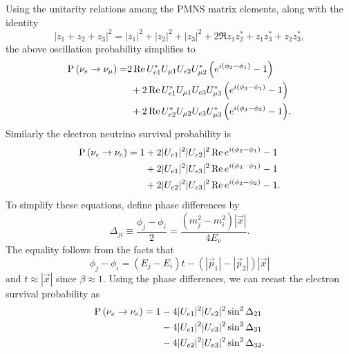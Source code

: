 Using the unitarity relations among the PMNS matrix elements, along with the
identity
\begin{equation}
  |z_1+z_2+z_3|^2=|z_1|^2+|z_2|^2+|z_3|^2
                  +2\Re{z_1z_2^*+z_1z_3^*+z_2z_3^*},
\end{equation}
the above oscillation probability simplifies to
\begin{equation}
  \begin{aligned}
    \operatorname{P}\left(\nu_e\to\nu_\mu\right)=&
    2\mathop{\mathrm{Re}}{U_{e1}^*U_{\mu 1}U_{e2}U_{\mu 2}^*\left(e^{i(\phi_2-\phi_1)}-1\right)}
     \\&~+
    2\mathop{\mathrm{Re}}{U_{e1}^*U_{\mu 1}U_{e3}U_{\mu 3}^*\left(e^{i(\phi_3-\phi_1)}-1\right)}
     \\&~+
    2\mathop{\mathrm{Re}}{U_{e2}^*U_{\mu 2}U_{e3}U_{\mu 3}^*\left(e^{i(\phi_3-\phi_2)}-1\right)}
     .
  \end{aligned}
\end{equation}
Similarly the electron neutrino survival probability is
\begin{equation}
  \begin{aligned}
    \operatorname{P}\left(\nu_e\to\nu_e\right)=1&+2|U_{e1}|^2|U_{e2}|^2\mathop{\mathrm{Re}}{e^{i(\phi_2-\phi_1)}-1} \\
                        &+2|U_{e1}|^2|U_{e3}|^2\mathop{\mathrm{Re}}{e^{i(\phi_3-\phi_1)}-1} \\
                        &+2|U_{e2}|^2|U_{e3}|^2\mathop{\mathrm{Re}}{e^{i(\phi_3-\phi_2)}-1}.
  \end{aligned}
\end{equation}
To simplify these equations, define phase differences by
\begin{equation}
  \label{eq:phase}
  \Delta_{ji}\equiv\frac{\phi_j-\phi_i}{2}
                  =\frac{(m_j^2-m_i^2)|\vec{x}|}{4E_\nu}.
\end{equation}
The equality follows from the facts that
\begin{equation}
  \phi_j-\phi_i=(E_j-E_i)t-(|\vec{p}_1|-|\vec{p}_2|)|\vec{x}|
\end{equation}
and $t\approx|\vec{x}|$ since $\beta\approx1$.
Using the phase differences, we can recast the electron survival probability as
\begin{equation}
  \label{eq:esurv}
  \begin{aligned}
    \operatorname{P}\left(\nu_e\to\nu_e\right)=1&-4|U_{e1}|^2|U_{e2}|^2\sin^2\Delta_{21} \\
                        &-4|U_{e1}|^2|U_{e3}|^2\sin^2\Delta_{31} \\
                        &-4|U_{e2}|^2|U_{e3}|^2\sin^2\Delta_{32}.
  \end{aligned}
\end{equation}
